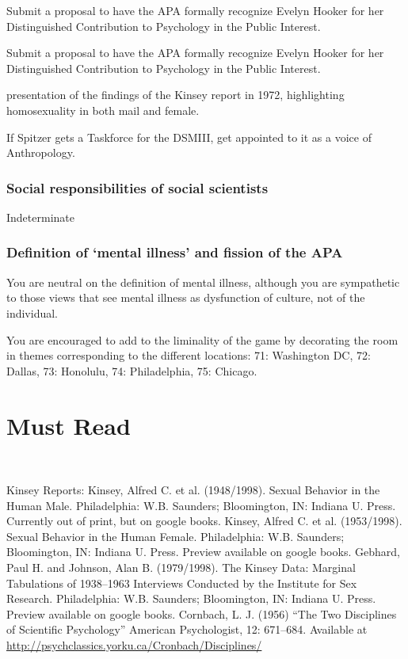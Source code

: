 \begin{refsection}
\begin{proposal}[Gebhard]\label{proposal:gebhard}
Submit a proposal to have the APA formally recognize Evelyn Hooker for her Distinguished Contribution to Psychology in the Public Interest.\end{proposal}

Submit a proposal to have the APA formally recognize Evelyn Hooker for her Distinguished Contribution to Psychology in the Public Interest.

\begin{writingtask}[Gebhard]\label{writingtask:gebhard}
presentation of the findings of the Kinsey report in 1972, highlighting homosexuality in both mail and female. 
\end{writingtask}

If Spitzer gets a Taskforce for the DSMIII, get appointed to it as a voice of Anthropology.

\subsubsection{Social responsibilities of social scientists}
\label{socialresponsibilitiesofsocialscientists}

Indeterminate

\subsubsection{Definition of ‘mental illness’ and fission of the APA}
\label{definitionof‘mentalillness’andfissionoftheapa}

You are neutral on the definition of mental illness, although you are sympathetic to those views that see mental illness as dysfunction of culture, not of the individual. 

You are encouraged to add to the liminality of the game by decorating the room in themes corresponding to the different locations: 71: Washington DC, 72: Dallas, 73: Honolulu, 74: Philadelphia, 75: Chicago.

\section{Must Read}
\label{mustread}

~\citep{Mead:1928uk}

Kinsey Reports:
Kinsey, Alfred C. et al. (1948\slash 1998). Sexual Behavior in the Human Male. Philadelphia: W.B. Saunders; Bloomington, IN: Indiana U. Press. Currently out of print, but on google books.
Kinsey, Alfred C. et al. (1953\slash 1998). Sexual Behavior in the Human Female. Philadelphia: W.B. Saunders; Bloomington, IN: Indiana U. Press. Preview available on google books.
Gebhard, Paul H. and Johnson, Alan B. (1979\slash 1998). The Kinsey Data: Marginal Tabulations of 1938--1963 Interviews Conducted by the Institute for Sex Research. Philadelphia: W.B. Saunders; Bloomington, IN: Indiana U. Press. Preview available on google books.
Cornbach, L. J. (1956) “The Two Disciplines of Scientific Psychology” American Psychologist, 12: 671--684. Available at \url{http://psychclassics.yorku.ca/Cronbach/Disciplines/}


\end{refsection}
